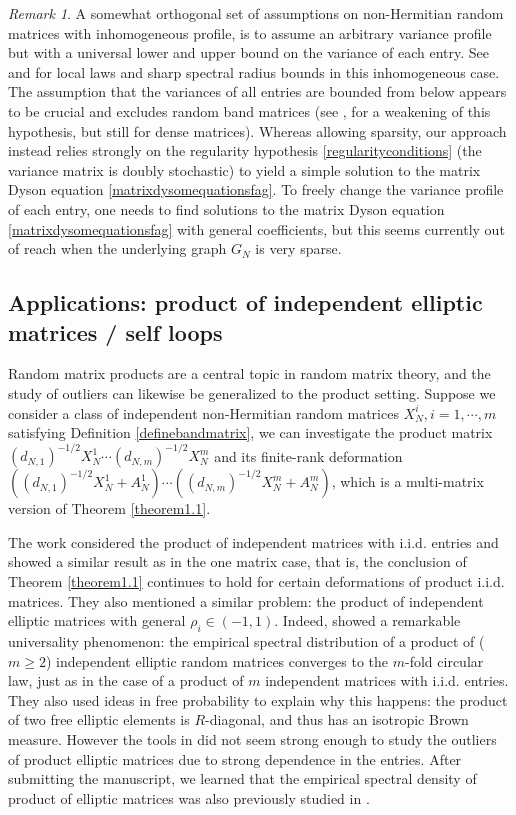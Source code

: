 \documentclass[11pt,reqno]{amsart}
\theoremstyle{plain}
\theoremstyle{remark}
\newtheorem{remark}[theorem]{Remark}
\numberwithin{equation}{section}
\begin{document}
\begin{remark}A somewhat orthogonal set of assumptions on non-Hermitian random matrices with inhomogeneous profile, is to assume an arbitrary variance profile but with a universal lower and upper bound on the variance of each entry. See \cite{alt2018local} and \cite{alt2021spectral} for local laws and sharp spectral radius bounds in this inhomogeneous case. The assumption that the variances of all entries are bounded from below appears to be crucial and excludes random band matrices (see \cite{cook1article},\cite{cook2article} for a weakening of this hypothesis, but still for dense matrices). 
    Whereas allowing sparsity, our approach instead relies strongly on the regularity hypothesis \eqref{regularityconditions} (the variance matrix is doubly stochastic) to yield a simple solution to the matrix Dyson equation \eqref{matrixdysomequationsfag}. To freely change the variance profile of each entry, one needs to find solutions to the matrix Dyson equation \eqref{matrixdysomequationsfag} with general coefficients, but this seems currently out of reach when the underlying graph $G_N$ is very sparse.
\end{remark}


\subsection{Applications: product of independent elliptic matrices / self loops}   Random matrix products are a central topic in random matrix theory, and the study of outliers can likewise be generalized to the product setting. Suppose we consider a class of independent non-Hermitian random matrices $X_N^{i},i=1,\cdots,m$ satisfying Definition \ref{definebandmatrix}, we can investigate the product matrix $(d_{N,1})^{-1/2}X_N^1\cdots(d_{N,m})^{-1/2}X_N^m$ and its finite-rank deformation $((d_{N,1})^{-1/2}X_N^1+A_N^1)\cdots((d_{N,m})^{-1/2}X_N^m+A_N^m)$, which is a multi-matrix version of Theorem \ref{theorem1.1}. 



The work \cite{coston2020outliers} considered the product of independent matrices with i.i.d. entries and showed a similar result as in the one matrix case, that is, the conclusion of Theorem \ref{theorem1.1} continues to hold for certain deformations of product i.i.d. matrices. They also mentioned a similar problem: the product of independent elliptic matrices with general $\rho_i\in(-1,1)$. Indeed, \cite{o2015products} showed a remarkable universality phenomenon: the empirical spectral distribution of a product of ($m\geq 2$) independent elliptic random matrices converges to the $m$-fold circular law, just as in the case of a product of $m$ independent matrices with i.i.d. entries. They also used ideas in free probability to explain why this happens: the product of two free elliptic elements is $R$-diagonal, and thus has an isotropic Brown measure. However the tools in \cite{coston2020outliers} did not seem strong enough to study the outliers of product elliptic matrices due to strong dependence in the entries. After submitting the manuscript, we learned that the empirical spectral density of product of elliptic matrices was also previously studied in \cite{gotze2014one}.
\end{document}
